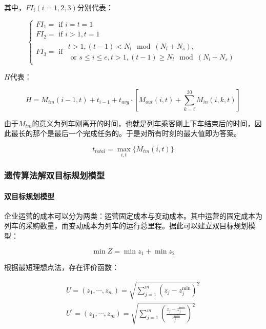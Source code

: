 其中，$FI_i(i=1,2,3)$分别代表：

\begin{equation*}
    \begin{cases}
        FI_1 = \text{ if } i = t = 1   \\
        FI_2 = \text{ if } i > 1, t = 1    \\
        FI_3 = \text{ if }\begin{matrix}
            t > 1, (t - 1) < N_l \mod (N_l + N_s),  \\
            \text{ or } s \leq i \leq e, t > 1, (t - 1) \geq N_l \mod (N_l + N_s)
            \end{matrix}
    \end{cases}
\end{equation*}

$H$代表：

\begin{equation*}
    H = M_{tm}(i - 1, t) + t_{i - 1} + t_{avg} \cdot \left[
			M_{out}(i, t) + \sum _{k = i} ^{30} M_{in}(i, k, t)
		\right]
\end{equation*}

由于$M_{tm}$的意义为列车刚离开的时间，也就是列车乘客刚上下车结束后的时间，因此最长的那个是最后一个完成任务的。于是对所有时刻的最大值即为答案。

\begin{equation}
t_{total} = \max _{i, t} \{M_{tm}(i, t)\}
\end{equation}


\subsubsection{遗传算法解双目标规划模型}

\paragraph{双目标规划模型}

企业运营的成本可以分为两类：运营固定成本与变动成本。其中运营的固定成本为列车的采购数量，而变动成本为列车的运行总里程。据此可以建立双目标规划模型\cite{caoJiyuchengkedengdaishijiandechengshiguidaojiaotongliecheshikebiaoyouhuamoxingyusuanfayanjiu2021}：

\begin{equation}
    \min Z = \min z_1 + \min z_2
\end{equation}

根据最短理想点法，存在评价函数：

\begin{align}
    U = (z_1, \cdots, z_m) = \sqrt{\sum_{j=1}^m(z_j-z_j^{\min})^2}  \\
    U^{'} = (z_1, \cdots, z_m) = \sqrt{
        \sum_{j=1}^m (
                \frac{z_j-z_j^{\min}}{z_j^{\min}}
            )^2
        }
\end{align}

